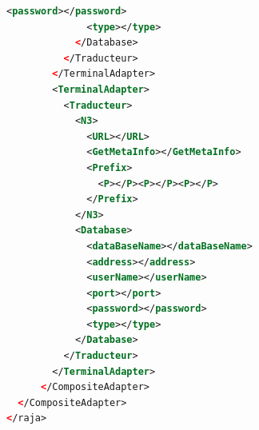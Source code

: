 \documentclass[12pt]{article}
\begin{document}
\begin{lstlisting}[language=XML]
              <password></password>
              <type></type>
            </Database>
          </Traducteur>
        </TerminalAdapter>
        <TerminalAdapter>
          <Traducteur>
            <N3>
              <URL></URL>
              <GetMetaInfo></GetMetaInfo>
              <Prefix>
                <P></P><P></P><P></P>
              </Prefix>
            </N3>
            <Database>
              <dataBaseName></dataBaseName>
              <address></address>
              <userName></userName>
              <port></port>
              <password></password>
              <type></type>
            </Database>
          </Traducteur>
        </TerminalAdapter>
      </CompositeAdapter>
  </CompositeAdapter>
</raja>
\end{lstlisting}
\end{document}
